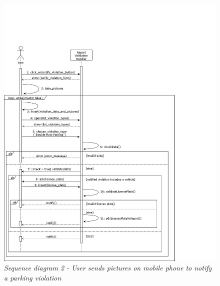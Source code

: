 \begin{figure}[H]
    \centering
    \includegraphics[width=\textwidth]{RASD_Images/SequenceDiagrams/2.jpg}
    \caption{\textit{Sequence diagram 2 - User sends pictures on mobile phone to notify a parking violation}}
\end{figure}

